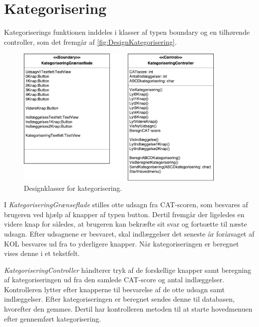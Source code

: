 \section{Kategorisering}
Kategoriserings funktionen inddeles i klasser af typen boundary og en tilhørende controller, som det fremgår af \autoref{fig:DesignKategorisering}.

\begin{figure} [H]
\centering
\includegraphics[width=0.9\textwidth]{figures/MVC/MVCKategorisering}
\caption{Designklasser for kategorisering.}
\label{fig:DesignKategorisering}
\end{figure}

\noindent
I \textit{KategoriseringGrænseflade} stilles otte udsagn fra CAT-scoren, som besvares af brugeren ved hjælp af knapper af typen button. Dertil fremgår der ligeledes en videre knap for således, at brugeren kan bekræfte sit svar og fortsætte til næste udsagn. Efter udsagnene er besvaret, skal indlæggelser det seneste år forårsaget af KOL besvares ud fra to yderligere knapper. Når kategoriseringen er beregnet vises denne i et tekstfelt. 

\textit{KategoriseringController} håndterer tryk af de forskellige knapper samt beregning af kategoriseringen ud fra den samlede CAT-score og antal indlæggelser. Kontrolleren lytter efter knapperne til besvarelse af de otte udsagn samt indlæggelser. Efter kategoriseringen er beregnet sendes denne til databasen, hvorefter den gemmes. Dertil har kontrolleren metoden til at starte hovedmenuen efter gennemført kategorisering.  